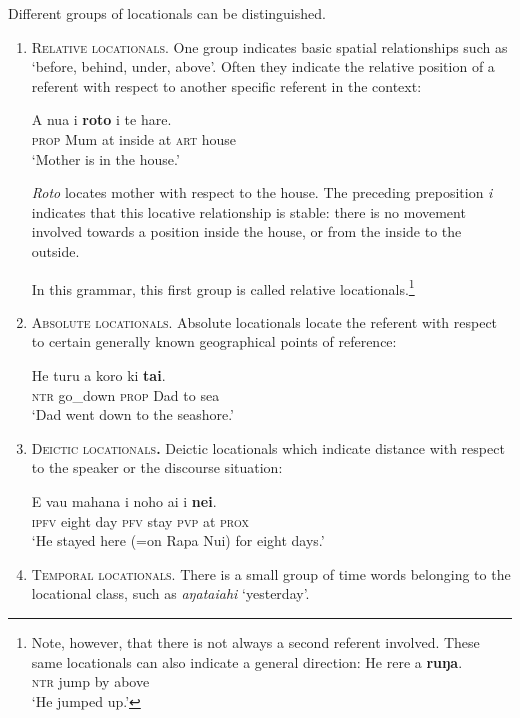 Different groups of locationals can be distinguished. 
\begin{enumerate}
\item 
\textsc{Relative locationals.} One group indicates basic spatial relationships such as ‘before, behind, under, above’. Often they indicate the relative position of a referent with respect to another specific referent in the context:

\ea\label{ex:3.126}
\gll A nua {\ꞌ}i \textbf{roto} i te hare. \\
\textsc{prop} Mum at inside at \textsc{art} house \\

\glt
‘Mother is in the house.’ \textstyleExampleref{[R333.284]} 
\z

\textit{Roto} locates mother with respect to the house. The preceding preposition \textit{{\ꞌ}i} indicates that this locative relationship is stable: there is no movement involved towards a position inside the house, or from the inside to the outside.

In this grammar, this first group is called relative locationals.\footnote{\label{fn:139}Note, however, that there is not always a second referent involved. These same locationals can also indicate a general direction:
\ea
\gll
He rere a \textbf{ruŋa}.\\
  \textsc{ntr} jump by above\\
 \glt
 ‘He jumped up.’
\z
}
\item
\textsc{Absolute locationals}. Absolute locationals locate the referent with respect to certain generally known geographical points of reference:

\ea\label{ex:3.127}
\gll He turu a koro ki \textbf{tai}. \\
\textsc{ntr} go\_down \textsc{prop} Dad to sea \\

\glt
‘Dad went down to the seashore.’ \textstyleExampleref{[R333.388]} 
\z

\item
\textsc{Deictic locationals}\textbf{.} Deictic locationals which indicate distance with respect to the speaker or the discourse situation:

\ea\label{ex:3.128}
\gll E va{\ꞌ}u mahana i noho ai {\ꞌ}i \textbf{nei}. \\
\textsc{ipfv} eight day \textsc{pfv} stay \textsc{pvp} at \textsc{prox} \\

\glt
‘He stayed here (=on Rapa Nui) for eight days.’ \textstyleExampleref{[R374.005]} 
\z

\item
\textsc{Temporal locationals.} There is a small group of time words belonging to the locational class, such as \textit{{\ꞌ}aŋataiahi} ‘yesterday’.
\end{enumerate}
